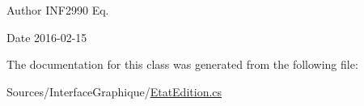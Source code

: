 \begin{DoxyAuthor}{Author}
I\+N\+F2990 Eq. 
\end{DoxyAuthor}
\begin{DoxyDate}{Date}
2016-\/02-\/15 
\end{DoxyDate}


The documentation for this class was generated from the following file\+:\begin{DoxyCompactItemize}
\item 
Sources/\+Interface\+Graphique/\hyperlink{_etat_edition_8cs}{Etat\+Edition.\+cs}\end{DoxyCompactItemize}
